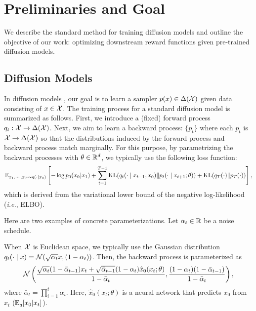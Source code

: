 \vspace{-2mm}
\section{Preliminaries and Goal}
\vspace{-2mm}
We describe the standard method for training diffusion models and outline the objective of our work: optimizing downstream reward functions given pre-trained diffusion models.

\vspace{-2mm}
\subsection{Diffusion Models }\label{sec:diffusion}
\vspace{-2mm}


In diffusion models \citep{ho2020denoising,song2020denoising}, our goal is to learn a sampler $p(x) \in \Delta(\mathcal{X})$ given data consisting of $x \in \mathcal{X}$. The training process for a standard diffusion model is summarized as follows. First, we introduce a (fixed) forward process $q_t:\mathcal{X}  \to \Delta(\mathcal{X})$. Next, we aim to learn a backward process: $\{p_t\}$ where each $p_t$ is $\mathcal{X} \to \Delta(\mathcal{X})$ so that the distributions induced by the forward process and backward process match marginally. For this purpose, by parametrizing the backward processes with $\theta \in \mathbb{R}^d$, we typically use the following loss function:
\begin{align*} 
 \mathbb{E}_{x_1,\cdots,x_T\sim q(\cdot|x_0)}\left [-\log p_0(x_0|x_1) + \sum_{t=1}^{T-1}\mathrm{KL}(q_{t}(\cdot \mid x_{t-1},x_0) \| p_{t}(\cdot \mid x_{t+1};\theta)) +  \mathrm{KL}( q_{T}(\cdot) \| p_{T}(\cdot) ) \right],
\end{align*}
which is derived from the variational lower bound of the negative log-likelihood (\textit{i.e.}, ELBO). 

Here are two examples of concrete parameterizations. Let $\alpha_t \in \mathbb{R}$ be a noise schedule.  

\begin{example}
When $\mathcal{X}$ is Euclidean space, we typically use the Gaussian distribution $q_t(\cdot\mid x) = \mathcal{N}(\sqrt{ \alpha_t}x, (1- \alpha_t) )$. Then, the backward process is parameterized as 
\begin{align*}
    \mathcal{N}\left (\frac{\sqrt{ \alpha_t}(1- \bar \alpha_{t-1}) x_t +  \sqrt{ \bar \alpha_{t-1}}(1-\alpha_t)\hat x_0(x_t;\theta) }{1 - \bar \alpha_t},\frac{(1-\alpha_t)(1-\bar \alpha_{t-1}) }{1-\bar \alpha_t }  \right),  
\end{align*}
where $\bar \alpha_t= \prod_{i=1}^t \alpha_i $. Here, $\hat{x}_0(x_t; \theta)$ is a neural network that predicts $x_0$ from $x_t$ ($\mathbb{E}_{q}[x_0|x_t]$). 
\end{example}

